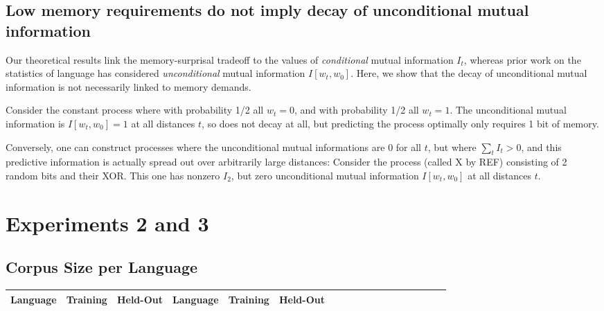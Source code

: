 \documentclass[11pt,letterpaper]{article}
\begin{document}
\subsection{Low memory requirements do not imply decay of unconditional mutual information}

Our theoretical results link the memory-surprisal tradeoff to the values of \emph{conditional} mutual information $I_t$, whereas prior work on the statistics of language has considered \emph{unconditional} mutual information $I[w_t, w_0]$.
Here, we show that the decay of unconditional mutual information is not necessarily linked to memory demands.


Consider the constant process where with probability 1/2 all $w_t = 0$, and with probability 1/2 all $w_t = 1$.
The unconditional mutual information is $I[w_t, w_0] = 1$ at all distances $t$, so does not decay at all, but predicting the process optimally only requires 1 bit of memory.

Conversely, one can construct processes where the unconditional mutual informations are 0 for all $t$, but where $\sum_t I_t > 0$, and this predictive information is actually spread out over arbitrarily large distances: Consider the process (called X by REF) consisting of 2 random bits and their XOR. This one has nonzero $I_2$, but zero unconditional  mutual information $I[w_t, w_0]$ at all distances $t$.




\section{Experiments 2 and 3}

\subsection{Corpus Size per Language}

\begin{center}
\begin{longtable}{l|ll||l|llllllllllllll}
	Language & Training & Held-Out & 	Language & Training & Held-Out\\ \hline

\end{longtable}
	\label{tab:corpora}
\end{center}
\end{document}

